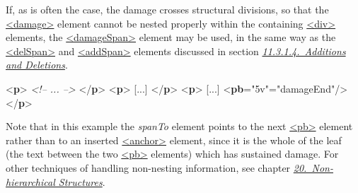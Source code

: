 If, as is often the case, the damage crosses structural divisions, so that the \hyperref[TEI.damage]{<damage>} element cannot be nested properly within the containing \hyperref[TEI.div]{<div>} elements, the \hyperref[TEI.damageSpan]{<damageSpan>} element may be used, in the same way as the \hyperref[TEI.delSpan]{<delSpan>} and \hyperref[TEI.addSpan]{<addSpan>} elements discussed in section \textit{\hyperref[PHAD]{11.3.1.4.\ Additions and Deletions}}. \par\bgroup{}\exampleFont \begin{shaded}\noindent\mbox{}{<\textbf{p}>}\mbox{}\newline 
\textit{<!-- ... -->}\mbox{}\newline 
{}\mbox{}\newline 
{}\mbox{}\newline 
{</\textbf{p}>}\mbox{}\newline 
{<\textbf{p}>} [...] {</\textbf{p}>}\mbox{}\newline 
{<\textbf{p}>} [...] {<\textbf{pb}\hspace*{1em}{n}="{5v}"\hspace*{1em}{xml:id}="{damageEnd}"/>}\mbox{}\newline 
{</\textbf{p}>}\end{shaded}\egroup\par \noindent  Note that in this example the {\itshape spanTo} element points to the next \hyperref[TEI.pb]{<pb>} element rather than to an inserted \hyperref[TEI.anchor]{<anchor>} element, since it is the whole of the leaf (the text between the two \hyperref[TEI.pb]{<pb>} elements) which has sustained damage. For other techniques of handling non-nesting information, see chapter \textit{\hyperref[NH]{20.\ Non-hierarchical Structures}}.\par
